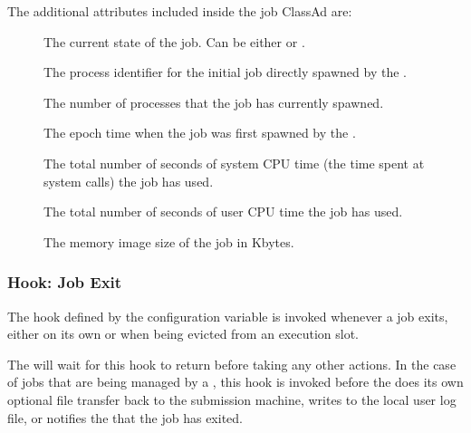 The additional attributes included inside the job ClassAd are:
\begin{description}
\item[]
  The current state of the job.
  Can be either  or .

\item[]
  The process identifier for the initial job directly spawned by the
  .

\item[]
  The number of processes that the job has currently spawned.

\item[]
  The epoch time when the job was first spawned by the .

\item[]
  The total number of seconds of system CPU time (the time spent at
  system calls) the job has used.

\item[]
  The total number of seconds of user CPU time the job has used.

\item[]
  The memory image size of the job in Kbytes.
\end{description}


\subsubsection{\label{sec:job-hooks-job-exit}
Hook: Job Exit}

The hook defined by the configuration variable
 is invoked whenever a job exits, either on its
own or when being evicted from an execution slot.

The  will wait for this hook to return before
taking any other actions.
In the case of jobs that are being managed by a , this
hook is invoked before the  does its own optional file
transfer back to the submission machine, writes to the local user log
file, or notifies the  that the job has exited.

